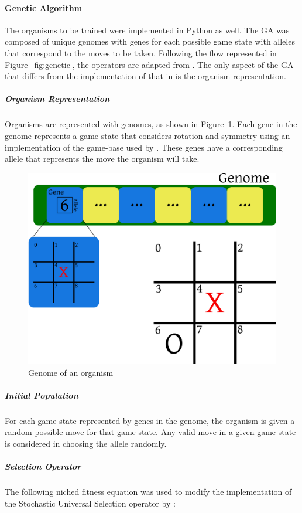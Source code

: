 \documentclass{strrespaper-trad}
\begin{document}
				\paragraph{Genetic Algorithm}
					The organisms to be trained were implemented in Python as well.
					The GA was composed of unique genomes with genes for each possible game state with alleles that correspond to the moves to be taken.
					Following the flow represented in Figure~\ref{fig:genetic}, the operators are adapted from \textcite{bhattSearchNolossStrategies2008}.
					The only aspect of the GA that differs from the implementation of that in \textcite{bhattSearchNolossStrategies2008} is the organism representation.
					\subparagraph{Organism Representation}
						Organisms are represented with genomes, as shown in Figure~\ref{fig:genome}.
						Each gene in the genome represents a game state that considers rotation and symmetry using an implementation of the game-base used by \textcite{bhattSearchNolossStrategies2008}.
						These genes have a corresponding allele that represents the move the organism will take.
						\begin{figure}[htbp]
							\centering
							\includegraphics[width=0.75\linewidth]{../figures/representation}
							\caption{Genome of an organism}
							\label{fig:genome}
						\end{figure}
					\subparagraph{Initial Population}
						For each game state represented by genes in the genome, the organism is given a random possible move for that game state.
						Any valid move in a given game state is considered in choosing the allele randomly.
					\subparagraph{Selection Operator}
						The following niched fitness equation \autocite{bhattSearchNolossStrategies2008} was used to modify the implementation of the Stochastic Universal Selection operator by \textcite{panchapakesanStochasticUniversalSampling2014}:
\end{document}
